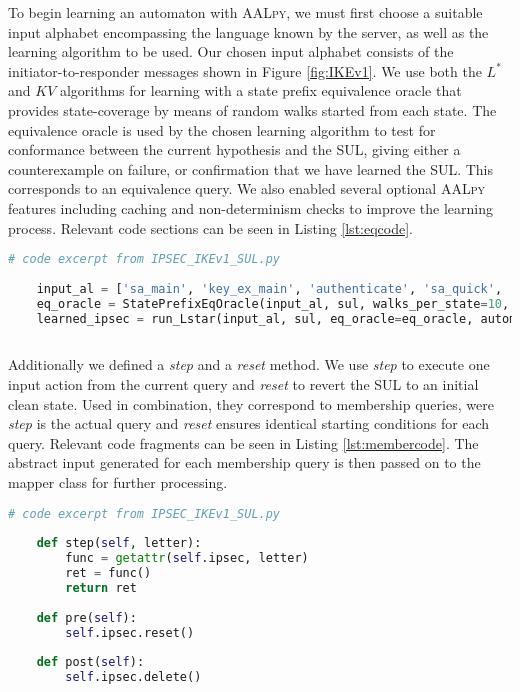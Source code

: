 To begin learning an automaton with \textsc{AALpy}, we must first choose a suitable input alphabet encompassing the language known by the server, as well as the learning algorithm to be used. Our chosen input alphabet consists of the initiator-to-responder messages shown in Figure \ref{fig:IKEv1}. We use both the $L^*$ and $KV$ algorithms for learning with a state prefix equivalence oracle that provides state-coverage by means of random walks started from each state. The equivalence oracle is used by the chosen learning algorithm to test for conformance between the current hypothesis and the SUL, giving either a counterexample on failure, or confirmation that we have learned the SUL. This corresponds to an equivalence query. We also enabled several optional \textsc{AALpy} features including caching and non-determinism checks to improve the learning process. Relevant code sections can be seen in Listing \ref{lst:eqcode}.

\begin{lstlisting}[float=ht, caption=Equivalence Query code, label=lst:eqcode, numbers=none, language=python]
	# code excerpt from IPSEC_IKEv1_SUL.py
	
	input_al = ['sa_main', 'key_ex_main', 'authenticate', 'sa_quick', 'ack_quick']
	eq_oracle = StatePrefixEqOracle(input_al, sul, walks_per_state=10, walk_len=10)
	learned_ipsec = run_Lstar(input_al, sul, eq_oracle=eq_oracle, automaton_type='mealy', cache_and_non_det_check=True)
	
\end{lstlisting}

Additionally we defined a \emph{step} and a \emph{reset} method. We use \emph{step} to execute one input action from the current query and \emph{reset} to revert the SUL to an initial clean state. Used in combination, they correspond to membership queries, were \emph{step} is the actual query and \emph{reset} ensures identical starting conditions for each query. Relevant code fragments can be seen in Listing \ref{lst:membercode}. The abstract input generated for each membership query is then passed on to the mapper class for further processing.\\

\begin{lstlisting}[float=ht, caption=Membership Query code, label=lst:membercode, numbers=none, language=python]
	# code excerpt from IPSEC_IKEv1_SUL.py
	
	def step(self, letter):
		func = getattr(self.ipsec, letter)
		ret = func()
		return ret
	
	def pre(self):
		self.ipsec.reset()
		
	def post(self):
		self.ipsec.delete()
\end{lstlisting}

